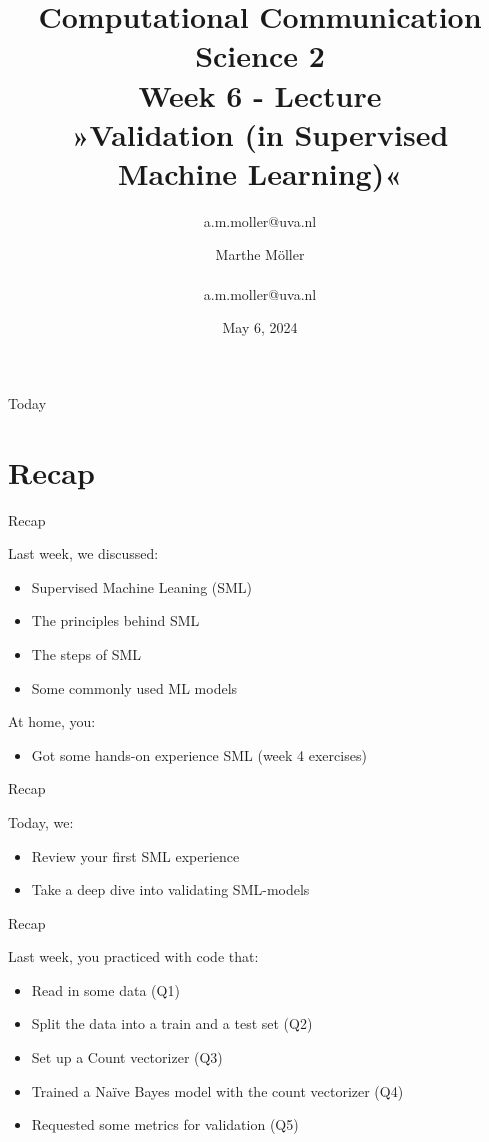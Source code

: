 \documentclass[compress]{beamer}
\title[Computational Communication Science 2]{\textbf{Computational Communication Science 2} \\Week 6 - Lecture\\ »Validation (in Supervised Machine Learning)«}
\author[Marthe Möller]{a.m.moller@uva.nl}\author[A. Marthe Möller]{Marthe Möller \\ ~ \\ \footnotesize{a.m.moller@uva.nl} \\}
\date{May 6, 2024}
\institute[Digital Society Minor, University of Amsterdam]{Digital Society Minor, University of Amsterdam}
\begin{document}
	
	\begin{frame}{}
		\titlepage
	\end{frame}
	
	\begin{frame}{Today}
		\begin{tiny}
			\tableofcontents
		\end{tiny}
	\end{frame}


\section{Recap}

\begin{frame}[fragile]{Recap} 
	
\begin{alertblock}{Last week, we discussed:}
\begin{itemize}
	\item Supervised Machine Leaning (SML)
	\item The principles behind SML
	\item The steps of SML
	\item Some commonly used ML models
\end{itemize}
\end{alertblock}
	
\begin{alertblock}{At home, you:}
\begin{itemize}
	\item Got some hands-on experience SML (week 4 exercises)
\end{itemize}
\end{alertblock}	
\end{frame}


\begin{frame}[fragile]{Recap} 
\begin{alertblock}{Today, we:}
\begin{itemize}
	\item Review your first SML experience
	\item  Take a deep dive into validating SML-models
\end{itemize}
\end{alertblock}
	
\end{frame}


\begin{frame}[fragile]{Recap} 
	
\begin{alertblock}{Last week, you practiced with code that:}
\begin{itemize}
	\item Read in some data (Q1)
 	\item Split the data into a train and a test set (Q2)
	\item Set up a Count vectorizer (Q3)
	\item Trained a Naïve Bayes model with the count vectorizer (Q4)
	\item Requested some metrics for validation (Q5)
\end{itemize}
\end{alertblock}

\end{frame}
\end{document}
